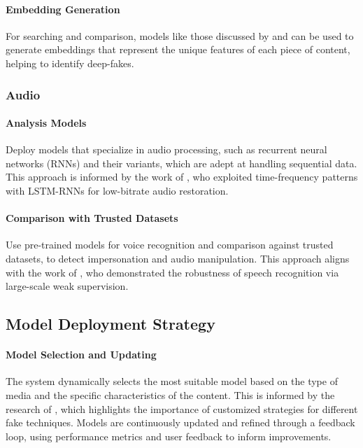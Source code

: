 \documentclass{article}
\begin{document}
\paragraph{Embedding Generation} For searching and comparison, models like those discussed by \citep{afchar2018mesonet} and \citep{li2021multi} can be used to generate embeddings that represent the unique features of each piece of content, helping to identify deep-fakes.

\subsubsection{Audio}
\paragraph{Analysis Models} Deploy models that specialize in audio processing, such as recurrent neural networks (RNNs) and their variants, which are adept at handling sequential data. This approach is informed by the work of \citep{deng2019exploiting}, who exploited time-frequency patterns with LSTM-RNNs for low-bitrate audio restoration.

\paragraph{Comparison with Trusted Datasets} Use pre-trained models for voice recognition and comparison against trusted datasets, to detect impersonation and audio manipulation. This approach aligns with the work of \citep{radford2021robust}, who demonstrated the robustness of speech recognition via large-scale weak supervision.

\subsection{Model Deployment Strategy}

\paragraph{Model Selection and Updating} The system dynamically selects the most suitable model based on the type of media and the specific characteristics of the content. This is informed by the research of \citep{masood2021deepfakes}, which highlights the importance of customized strategies for different fake techniques. Models are continuously updated and refined through a feedback loop, using performance metrics and user feedback to inform improvements.
\end{document}
